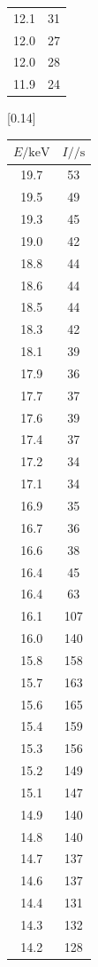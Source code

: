 \begin{table}[h! p]
{\begin{tabular}{|c c|}
    12.1 & 31 \\
    12.0 & 27 \\
    12.0 & 28 \\
    11.9 & 24 \\
    \bottomrule
  \end{tabular}
  }\qquad \hfill
  [0.14\textwidth]{
  \begin{tabular}{|c c|}
    \toprule
    $E / \si{\kilo\electronvolt}$ & $I / \si{\per\second}$ \\
    \midrule
    19.7 & 53 \\
    19.5 & 49 \\
    19.3 & 45 \\
    19.0 & 42 \\
    18.8 & 44 \\
    18.6 & 44 \\
    18.5 & 44 \\
    18.3 & 42 \\
    18.1 & 39 \\
    17.9 & 36 \\
    17.7 & 37 \\
    17.6 & 39 \\
    17.4 & 37 \\
    17.2 & 34 \\
    17.1 & 34 \\
    16.9 & 35 \\
    16.7 & 36 \\
    16.6 & 38 \\
    16.4 & 45 \\
    16.4 & 63 \\
    16.1 & 107 \\
    16.0 & 140 \\
    15.8 & 158 \\
    15.7 & 163 \\
    15.6 & 165 \\
    15.4 & 159 \\
    15.3 & 156 \\
    15.2 & 149 \\
    15.1 & 147 \\
    14.9 & 140 \\
    14.8 & 140 \\
    14.7 & 137 \\
    14.6 & 137 \\
    14.4 & 131 \\
    14.3 & 132 \\
    14.2 & 128 \\

\end{tabular}}
\end{table}
